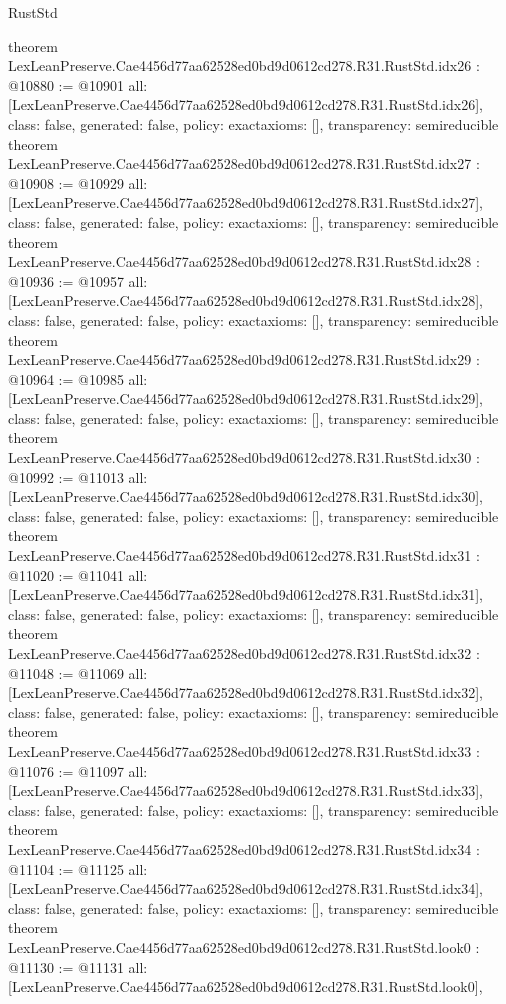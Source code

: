 \begin{lexlean}{RustStd}
\begin{coremodule}
{}
theorem LexLeanPreserve.Cae4456d77aa62528ed0bd9d0612cd278.R31.RustStd.idx26 : @10880 := @10901 {
  all: [LexLeanPreserve.Cae4456d77aa62528ed0bd9d0612cd278.R31.RustStd.idx26],
  class: false,
  generated: false,
  policy: exact{axioms: []},
  transparency: semireducible
}
theorem LexLeanPreserve.Cae4456d77aa62528ed0bd9d0612cd278.R31.RustStd.idx27 : @10908 := @10929 {
  all: [LexLeanPreserve.Cae4456d77aa62528ed0bd9d0612cd278.R31.RustStd.idx27],
  class: false,
  generated: false,
  policy: exact{axioms: []},
  transparency: semireducible
}
theorem LexLeanPreserve.Cae4456d77aa62528ed0bd9d0612cd278.R31.RustStd.idx28 : @10936 := @10957 {
  all: [LexLeanPreserve.Cae4456d77aa62528ed0bd9d0612cd278.R31.RustStd.idx28],
  class: false,
  generated: false,
  policy: exact{axioms: []},
  transparency: semireducible
}
theorem LexLeanPreserve.Cae4456d77aa62528ed0bd9d0612cd278.R31.RustStd.idx29 : @10964 := @10985 {
  all: [LexLeanPreserve.Cae4456d77aa62528ed0bd9d0612cd278.R31.RustStd.idx29],
  class: false,
  generated: false,
  policy: exact{axioms: []},
  transparency: semireducible
}
theorem LexLeanPreserve.Cae4456d77aa62528ed0bd9d0612cd278.R31.RustStd.idx30 : @10992 := @11013 {
  all: [LexLeanPreserve.Cae4456d77aa62528ed0bd9d0612cd278.R31.RustStd.idx30],
  class: false,
  generated: false,
  policy: exact{axioms: []},
  transparency: semireducible
}
theorem LexLeanPreserve.Cae4456d77aa62528ed0bd9d0612cd278.R31.RustStd.idx31 : @11020 := @11041 {
  all: [LexLeanPreserve.Cae4456d77aa62528ed0bd9d0612cd278.R31.RustStd.idx31],
  class: false,
  generated: false,
  policy: exact{axioms: []},
  transparency: semireducible
}
theorem LexLeanPreserve.Cae4456d77aa62528ed0bd9d0612cd278.R31.RustStd.idx32 : @11048 := @11069 {
  all: [LexLeanPreserve.Cae4456d77aa62528ed0bd9d0612cd278.R31.RustStd.idx32],
  class: false,
  generated: false,
  policy: exact{axioms: []},
  transparency: semireducible
}
theorem LexLeanPreserve.Cae4456d77aa62528ed0bd9d0612cd278.R31.RustStd.idx33 : @11076 := @11097 {
  all: [LexLeanPreserve.Cae4456d77aa62528ed0bd9d0612cd278.R31.RustStd.idx33],
  class: false,
  generated: false,
  policy: exact{axioms: []},
  transparency: semireducible
}
theorem LexLeanPreserve.Cae4456d77aa62528ed0bd9d0612cd278.R31.RustStd.idx34 : @11104 := @11125 {
  all: [LexLeanPreserve.Cae4456d77aa62528ed0bd9d0612cd278.R31.RustStd.idx34],
  class: false,
  generated: false,
  policy: exact{axioms: []},
  transparency: semireducible
}
theorem LexLeanPreserve.Cae4456d77aa62528ed0bd9d0612cd278.R31.RustStd.look0 : @11130 := @11131 {
  all: [LexLeanPreserve.Cae4456d77aa62528ed0bd9d0612cd278.R31.RustStd.look0],
}
\end{coremodule}
\end{lexlean}
